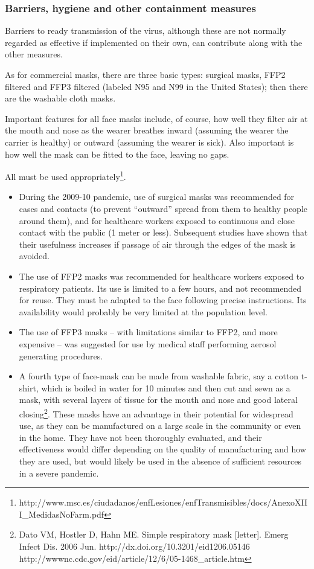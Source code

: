 \documentclass[12pt, a4]{scrartcl}
\begin{document}
\subsubsection{Barriers, hygiene and other containment measures}
Barriers to ready transmission of the virus, although these are not normally regarded as effective if implemented on their own, can contribute along with the other measures.

As for commercial masks, there are three basic types: surgical masks, FFP2 filtered and FFP3 filtered (labeled N95 and N99 in the United States); then there are the washable cloth masks.

Important features for all face masks include, of course, how well they filter air at the mouth and nose as the wearer breathes inward (assuming the wearer the carrier is healthy) or outward (assuming the wearer is sick). Also important is how well the mask can be fitted to the face, leaving no gaps.

All must be used appropriately\footnote{http://www.msc.es/ciudadanos/enfLesiones/enfTransmisibles/docs/AnexoXIII_MedidasNoFarm.pdf}.

\begin{itemize}
	\item During the 2009-10 pandemic, use of surgical masks was recommended for cases and contacts (to prevent “outward” spread from them to healthy people around them), and for healthcare workers exposed to continuous and close contact with the public (1 meter or less). Subsequent studies have shown that their usefulness increases if passage of air through the edges of the mask is avoided.
	\item The use of FFP2 masks was recommended for healthcare workers exposed to respiratory patients. Its use is limited to a few hours, and not recommended for reuse. They must be adapted to the face following precise instructions. Its availability would probably be very limited at the population level. 
	\item The use of FFP3 masks – with limitations similar to FFP2, and more expensive – was suggested for use by medical staff performing aerosol generating procedures.
	\item A fourth type of face-mask can be made from washable fabric, say a cotton t-shirt, which is boiled in water for 10 minutes and then cut and sewn as a mask, with several layers of tissue for the mouth and nose and good lateral closing\footnote{Dato VM, Hostler D, Hahn ME. Simple respiratory mask [letter]. Emerg Infect Dis. 2006 Jun. http://dx.doi.org/10.3201/eid1206.05146 http://wwwnc.cdc.gov/eid/article/12/6/05-1468_article.htm}. These masks have an advantage in their potential for widespread use, as they can be manufactured on a large scale in the community or even in the home. They have not been thoroughly evaluated, and their effectiveness would differ depending on the quality of manufacturing and how they are used, but would likely be used in the absence of sufficient resources in a severe pandemic.
\end{itemize}
\end{document}
